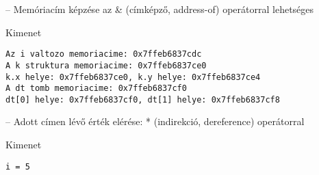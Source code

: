 \documentclass[usenames,dvipsnames,aspectratio=169]{beamer}
\begin{document}
\begin{frame}[fragile]
  \begin{exampleblock}{ -- Memóriacím képzése az \& (címképző, address-of) operátorral lehetséges}
    \vspace{-.2cm}
    \scriptsize
    
    \vspace{-.2cm}
  \end{exampleblock}
  \begin{block}{Kimenet}
    \vspace{-.3cm}
    \scriptsize
    \begin{verbatim}
Az i valtozo memoriacime: 0x7ffeb6837cdc
A k struktura memoriacime: 0x7ffeb6837ce0
k.x helye: 0x7ffeb6837ce0, k.y helye: 0x7ffeb6837ce4
A dt tomb memoriacime: 0x7ffeb6837cf0
dt[0] helye: 0x7ffeb6837cf0, dt[1] helye: 0x7ffeb6837cf8
\end{verbatim}
    \vspace{-.3cm}
  \end{block}
\end{frame}

\begin{frame}[fragile]
  \begin{exampleblock}{ -- Adott címen lévő érték elérése: * (indirekció, dereference) operátorral}
    \vspace{-.2cm}
    \footnotesize
    
    \vspace{-.2cm}
  \end{exampleblock}
  \begin{block}{Kimenet}
    \vspace{-.3cm}
    \footnotesize
    \begin{verbatim}
i = 5
\end{verbatim}
    \vspace{-.3cm}
  \end{block}
\end{frame}
\end{document}
